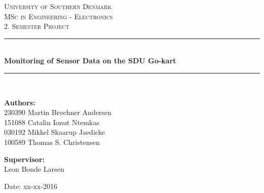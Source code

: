 \begin{titlepage}
\begin{center}

\textsc{\LARGE University of Southern Denmark}\\[1.5cm]
\textsc{\Large MSc in Engineering - Electronics}\\
\textsc{\large 2. Semester Project}\\[0.5cm]

\vfill
\vspace{3cm}
\hrule ~\\[0.3cm]
{ \LARGE \bfseries Monitoring of Sensor Data on the SDU Go-kart\\[0.4cm] }
\hrule ~\\[1.5cm]

\vfill

\vspace{7cm}
\begin{minipage}[t]{.55\textwidth}
\begin{flushleft} \large
\textbf{Authors:}\\
230390 Martin Brøchner Andersen\\
151088 Catalin Ionut Ntemkas\\
030192 Mikkel Skaarup Jaedicke\\
100589 Thomas S. Christensen
\end{flushleft}
\end{minipage}
\begin{minipage}[t]{.44\textwidth}
\begin{flushright} \large
\textbf{Supervisor:} \\
Leon Bonde Larsen
\end{flushright}
\end{minipage}

\vspace{1cm}
Date: xx-xx-2016

\vspace{1cm}

\end{center}
\end{titlepage}